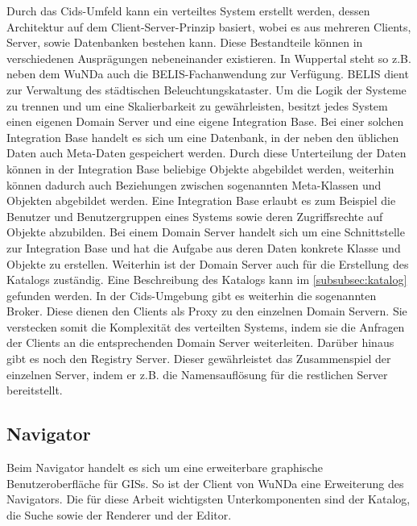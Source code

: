 Durch das Cids-Umfeld kann ein verteiltes System erstellt werden, dessen Architektur auf dem Client-Server-Prinzip basiert, wobei es aus mehreren Clients, Server, sowie Datenbanken bestehen kann.
Diese Bestandteile können in verschiedenen Ausprägungen nebeneinander existieren.
In Wuppertal steht so z.B. neben dem \ac{WuNDa} auch die BELIS-Fachanwendung zur Verfügung. BELIS dient zur Verwaltung des städtischen Beleuchtungskataster.
Um die Logik der Systeme zu trennen und um eine Skalierbarkeit zu gewährleisten, besitzt jedes System einen eigenen Domain Server und eine eigene Integration Base.
Bei einer solchen Integration Base handelt es sich um eine Datenbank, in der neben den üblichen Daten auch Meta-Daten gespeichert werden.
Durch diese Unterteilung der Daten können in der Integration Base beliebige Objekte abgebildet werden, weiterhin können dadurch auch Beziehungen zwischen sogenannten Meta-Klassen und Objekten abgebildet werden.
Eine Integration Base erlaubt es zum Beispiel die Benutzer und Benutzergruppen eines Systems sowie deren Zugriffsrechte auf Objekte abzubilden.
Bei einem Domain Server handelt sich um eine Schnittstelle zur Integration Base und hat die Aufgabe aus deren Daten konkrete Klasse und Objekte zu erstellen. Weiterhin ist der Domain Server auch für die Erstellung des Katalogs zuständig.
Eine Beschreibung des Katalogs kann im \autoref{subsubsec:katalog} gefunden werden.
In der Cids-Umgebung gibt es weiterhin die sogenannten Broker. Diese dienen den Clients als Proxy zu den einzelnen Domain Servern. Sie verstecken somit die Komplexität des verteilten Systems, indem sie die Anfragen der Clients an die entsprechenden Domain Server weiterleiten.
Darüber hinaus gibt es noch den Registry Server. Dieser gewährleistet das Zusammenspiel der einzelnen Server, indem er z.B. die Namensauflösung für die restlichen Server bereitstellt.

\subsection{Navigator}
Beim Navigator handelt es sich um eine erweiterbare graphische Benutzeroberfläche für \acp{GIS}. So ist der Client von \ac{WuNDa} eine Erweiterung des Navigators. Die für diese Arbeit wichtigsten Unterkomponenten sind der Katalog, die Suche sowie der Renderer und der Editor.

